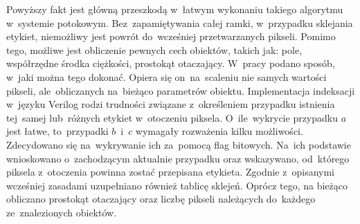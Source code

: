 Powyższy fakt jest główną przeszkodą w~łatwym wykonaniu takiego algorytmu w~systemie potokowym. 
Bez~zapamiętywania całej ramki, w~przypadku sklejania etykiet, niemożliwy jest powrót do~wcześniej przetwarzanych pikseli. 
Pomimo tego, możliwe jest obliczenie pewnych cech obiektów, takich jak: pole, współrzędne środka ciężkości, prostokąt otaczający. 
W~pracy \cite{COG} podano sposób, w~jaki można tego dokonać. 
Opiera się on~na~scaleniu nie samych wartości pikseli, ale~obliczanych na~bieżąco parametrów obiektu.
Implementacja indeksacji w~języku Verilog rodzi trudności związane z~określeniem przypadku istnienia tej~samej lub~różnych etykiet w~otoczeniu piksela. 
O~ile~wykrycie przypadku $a$ jest łatwe, to~przypadki $b$~i~$c$ wymagały rozważenia kilku możliwości. 
Zdecydowano się na~wykrywanie ich za~pomocą flag bitowych. 
Na~ich podstawie wnioskowano o~zachodzącym aktualnie przypadku oraz wskazywano, od~którego piksela z~otoczenia powinna zostać przepisana etykieta. Zgodnie z~opisanymi wcześniej zasadami uzupełniano również tablicę sklejeń.
Oprócz tego, na bieżąco obliczano prostokąt otaczający oraz liczbę pikseli należących do~każdego ze~znalezionych obiektów. \\

